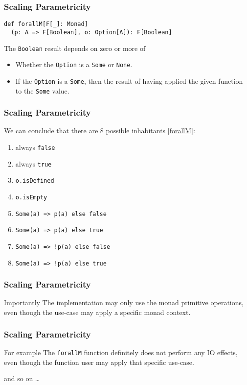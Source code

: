 \begin{frame}[fragile]
\frametitle{Scaling Parametricity}
\begin{lstlisting}[style=scala]
def forallM[F[_]: Monad]
  (p: A => F[Boolean], o: Option[A]): F[Boolean]
\end{lstlisting}
\begin{theorem}
  The \lstinline{Boolean} result depends on zero or more of
  \begin{itemize}
    \item Whether the \lstinline{Option} is a \lstinline{Some} or \lstinline{None}.
    \item If the \lstinline{Option} is a \lstinline{Some}, then the result of having applied the given function to the \lstinline{Some} value.
  \end{itemize}
\end{theorem}
\end{frame}

\begin{frame}[fragile]
\frametitle{Scaling Parametricity}
  We can conclude that there are 8 possible inhabitants \ref{forallM}:
  \begin{enumerate}
    \item always \lstinline{false}
    \item always \lstinline{true}
    \item \lstinline{o.isDefined}
    \item \lstinline{o.isEmpty}
    \item \lstinline{Some(a) => p(a) else false}
    \item \lstinline{Some(a) => p(a) else true}
    \item \lstinline{Some(a) => !p(a) else false}
    \item \lstinline{Some(a) => !p(a) else true}
  \end{enumerate}
\end{frame}

\begin{frame}[fragile]
\frametitle{Scaling Parametricity}
  \begin{block}{Importantly}
  The implementation may only use the monad primitive operations, even though the use-case may apply a specific monad context.
  \end{block}
\end{frame}

\begin{frame}[fragile]
\frametitle{Scaling Parametricity}
  \begin{block}{For example}
  The \lstinline{forallM} function definitely does not perform any IO effects, even though the function user may apply that specific use-case.
  \end{block}
  and so on \ldots
\end{frame}
